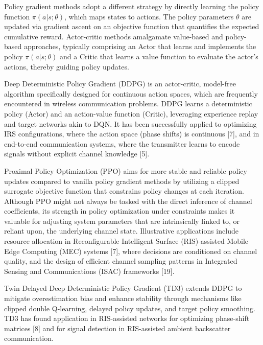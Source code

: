 \documentclass[journal,twocolumn]{IEEEtran}
\begin{document}
Policy gradient methods adopt a different strategy by directly learning the policy function $\pi(a|s; \theta)$, which maps states to actions. The policy parameters $\theta$ are updated via gradient ascent on an objective function that quantifies the expected cumulative reward. Actor-critic methods amalgamate value-based and policy-based approaches, typically comprising an Actor that learns and implements the policy $\pi(a|s; \theta)$ and a Critic that learns a value function to evaluate the actor's actions, thereby guiding policy updates.

Deep Deterministic Policy Gradient (DDPG) is an actor-critic, model-free algorithm specifically designed for continuous action spaces, which are frequently encountered in wireless communication problems. DDPG learns a deterministic policy (Actor) and an action-value function (Critic), leveraging experience replay and target networks akin to DQN. It has been successfully applied to optimizing IRS configurations, where the action space (phase shifts) is continuous [7], and in end-to-end communication systems, where the transmitter learns to encode signals without explicit channel knowledge [5].

Proximal Policy Optimization (PPO) aims for more stable and reliable policy updates compared to vanilla policy gradient methods by utilizing a clipped surrogate objective function that constrains policy changes at each iteration. Although PPO might not always be tasked with the direct inference of channel coefficients, its strength in policy optimization under constraints makes it valuable for adjusting system parameters that are intrinsically linked to, or reliant upon, the underlying channel state. Illustrative applications include resource allocation in Reconfigurable Intelligent Surface (RIS)-assisted Mobile Edge Computing (MEC) systems [7], where decisions are conditioned on channel quality, and the design of efficient channel sampling patterns in Integrated Sensing and Communications (ISAC) frameworks [19].

Twin Delayed Deep Deterministic Policy Gradient (TD3) extends DDPG to mitigate overestimation bias and enhance stability through mechanisms like clipped double Q-learning, delayed policy updates, and target policy smoothing. TD3 has found application in RIS-assisted networks for optimizing phase-shift matrices [8] and for signal detection in RIS-assisted ambient backscatter communication.
\end{document}
